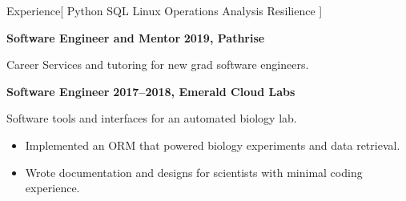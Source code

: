 \documentclass[11pt,a4paper]{article}
\newcommand{\archive}{https://web.archive.org/web}
\newcommand{\FadleyGroup}{
  \href{\archive/20201001085257/http://fadley.physics.ucdavis.edu/}
       {Fadley Group}
}
\begin{document}
\begin{mysection}{Experience}[
    Python
    \textbullet{} SQL
    \textbullet{} Linux
    \textbullet{} Operations
    \textbullet{} Analysis
    \textbullet{} Resilience
]
    \begin{addmargin}[0.5em]{0em}
    {\large\bfseries Software Engineer and Mentor}
    \hfill {\bfseries 2019, Pathrise}%
      \begin{adjustwidth}{1ex}{0ex}
      \hspace*{0ex}Career Services and tutoring for new grad software engineers.
      \end{adjustwidth}

%
%

  \end{addmargin}
  \medskip


  \begin{addmargin}[0.5em]{0em}
    {\large\bfseries Software Engineer}%
    \hfill {\bfseries 2017--2018, Emerald Cloud Labs}%
    \begin{adjustwidth}{1ex}{0ex}
      Software tools and interfaces for an automated biology lab.

      \begin{itemize}
        [label=-, topsep=0pt, itemsep=0.5ex, parsep=0pt, leftmargin=1em]
      \item Implemented an ORM that powered biology experiments and data
            retrieval.
      \item Wrote documentation and designs for scientists with minimal coding
            experience.
      \end{itemize}
    \end{adjustwidth}
  \end{addmargin}




\end{mysection}
\end{document}
